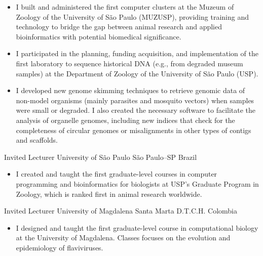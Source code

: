 \documentclass[11pt, letterpaper, sans]{moderncv}
\begin{document}
    \begin{itemize}[itemsep=-0.05in, labelindent=0in, leftmargin=1cm]\small
	    \item[\textcolor{color1}{\textbullet}] I built and administered the first computer clusters at the Muzeum of Zoology of the University of São Paulo (MUZUSP), providing training and technology to bridge the gap between animal research and applied bioinformatics with potential biomedical significance.
	    \item[\textcolor{color1}{\textbullet}] I participated in the planning, funding acquisition, and implementation of the first laboratory to sequence historical DNA (e.g., from degraded museum samples) at the Department of Zoology of the University of São Paulo (USP).
	    \item[\textcolor{color1}{\textbullet}] I developed new genome skimming techniques to retrieve genomic data of non-model organisms (mainly parasites and mosquito vectors) when samples were small or degraded. I also created the necessary software to facilitate the analysis of organelle genomes, including new indices that check for the completeness of circular genomes or misalignments in other types of contigs and scaffolds.
    \end{itemize}
    	{Invited Lecturer}
    	{University of São Paulo}
    	{São Paulo--SP}
    	{Brazil}
    	{}
    \vspace{-1em}
    \begin{itemize}[itemsep=-0.05in, labelindent=0in, leftmargin=1cm]\small
	    \item[\textcolor{color1}{\textbullet}] I created and taught the first graduate-level courses in computer programming and bioinformatics for biologists at USP's Graduate Program in Zoology, which is ranked first in animal research worldwide.
	\end{itemize}
    \vspace{-0.5em}
    	{Invited Lecturer}
    	{University of Magdalena}
    	{Santa Marta D.T.C.H.}
    	{Colombia}
    	{}
    \vspace{-1em}
    \begin{itemize}[itemsep=-0.05in, labelindent=0in, leftmargin=1cm]\small
	    \item[\textcolor{color1}{\textbullet}] I designed and taught the first graduate-level course in computational biology at the University of Magdalena. Classes focuses on the evolution and epidemiology of flaviviruses.
	\end{itemize}
\end{document}
